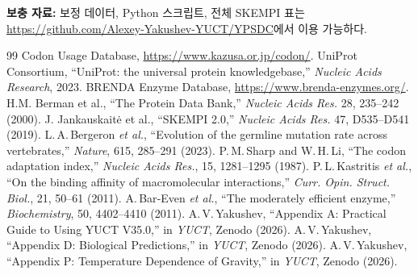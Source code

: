 \documentclass[12pt,a4paper]{article}
\begin{document}
	\vspace{0.5cm}
	\noindent\textbf{보충 자료:} 보정 데이터, Python 스크립트, 전체 SKEMPI 표는 \url{https://github.com/Alexey-Yakushev-YUCT/YPSDC}에서 이용 가능하다.
	
	\begin{thebibliography}{99}
		 Codon Usage Database, \url{https://www.kazusa.or.jp/codon/}.
		 UniProt Consortium, ``UniProt: the universal protein knowledgebase,'' \emph{Nucleic Acids Research}, 2023.
		 BRENDA Enzyme Database, \url{https://www.brenda-enzymes.org/}.
		 H.M. Berman et al., ``The Protein Data Bank,'' \emph{Nucleic Acids Res.} 28, 235–242 (2000).
		 J. Jankauskaitė et al., ``SKEMPI 2.0,'' \emph{Nucleic Acids Res.} 47, D535–D541 (2019).
		 L.\,A.\,Bergeron \emph{et al.}, ``Evolution of the germline mutation rate across vertebrates,'' \emph{Nature}, 615, 285–291 (2023).
		 P.\,M.\,Sharp and W.\,H.\,Li, ``The codon adaptation index,'' \emph{Nucleic Acids Res.}, 15, 1281–1295 (1987).
		 P.\,L.\,Kastritis \emph{et al.}, ``On the binding affinity of macromolecular interactions,'' \emph{Curr. Opin. Struct. Biol.}, 21, 50–61 (2011).
		 A.\,Bar‑Even \emph{et al.}, ``The moderately efficient enzyme,'' \emph{Biochemistry}, 50, 4402–4410 (2011).
		 A.\,V.\,Yakushev, ``Appendix A: Practical Guide to Using YUCT V35.0,'' in \emph{YUCT}, Zenodo (2026).
		 A.\,V.\,Yakushev, ``Appendix D: Biological Predictions,'' in \emph{YUCT}, Zenodo (2026).
		 A.\,V.\,Yakushev, ``Appendix P: Temperature Dependence of Gravity,'' in \emph{YUCT}, Zenodo (2026).
	\end{thebibliography}
	
\end{document}

